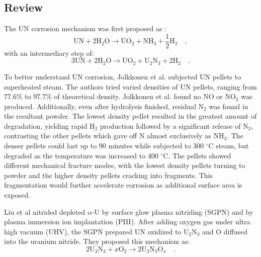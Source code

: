 \documentclass[11pt]{article}
\begin{document}
\begin{multicols}{2}
\section{Review}


\par 
The UN corrosion mechanism was first proposed as \cite{Dell1967,Sugihara1969}:
\begin{equation}
\mbox{UN} + 2\mbox{H}_{2}\mbox{O} \rightarrow \mbox{UO}_{2} + \mbox{NH}_{3} + \frac{1}{2} \mbox{H}_{2} \quad ,
\end{equation}
with an intermediary step of: 
\begin{equation}
3\mbox{UN}+2\mbox{H}_{2}\mbox{O} \rightarrow \mbox{UO}_{2}+\mbox{U}_{2}\mbox{N}_{3}+2\mbox{H}_{2} \quad .
\end{equation}

To better understand UN corrosion, Jolkkonen et al. \cite{Jolkkonen2017} subjected UN pellets to superheated steam. The authors tried varied densities of UN pellets, ranging from 77.6\% to 97.7\% of theoretical density. Jolkkonen et al. found no NO or NO$_{2}$ was produced. Additionally, even after hydrolysis finished, residual N$_{2}$ was found in the resultant powder. The lowest density pellet resulted in the greatest amount of degradation, yielding rapid H$_{2}$ production followed by a significant release of N$_{2}$, contrasting the other pellets which gave off N almost exclusively as NH$_{3}$. The denser pellets could last up to 90 minutes while subjected to 300 $^{\circ}$C steam, but degraded as the temperature was increased to 400 $^{\circ}$C. The pellets showed different mechanical fracture modes, with the lowest density pellets turning to powder and the higher density pellets cracking into fragments. This fragmentation would further accelerate corrosion as additional surface area is exposed.
\par 

Liu et al \cite{Liu2013} nitrided depleted $\alpha$-U by surface glow plasma nitriding (SGPN) and by plasma immersion ion implantation (PIII). After adding oxygen gas under ultra high vacuum (UHV), the SGPN prepared UN oxidized to U$_{2}$N$_{3}$ and O diffused into the uranium nitride. They proposed this mechanism as:
\begin{equation}
2\mbox{U}_{2}\mbox{N}_{3} +x \mbox{O}_{2} \rightarrow 2\mbox{U}_{2}\mbox{N}_{3}\mbox{O}_{x} \quad .
\end{equation}


\end{multicols}
\end{document}
